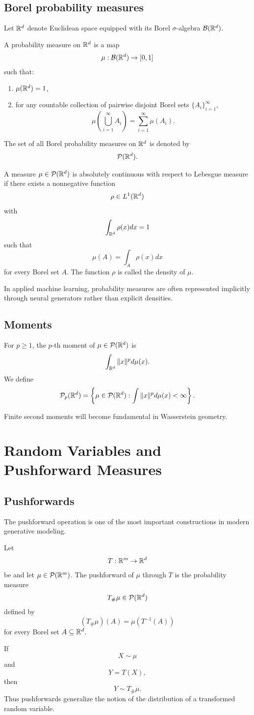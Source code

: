 \subsection{Borel probability measures}
Let $\mathbb{R}^d$ denote Euclidean space equipped with its Borel $\sigma$-algebra $\mathcal{B}(\mathbb{R}^d)$.
\begin{definition}
A probability measure on $\mathbb{R}^d$ is a map
\[
\mu : \mathcal{B}(\mathbb{R}^d) \to [0,1]
\]
such that:
\begin{enumerate}[label=(\alph*)]
    \item $\mu(\mathbb{R}^d)=1$,
    \item for any countable collection of pairwise disjoint Borel sets $\{A_i\}_{i=1}^{\infty}$,
    \[
    \mu\left(\bigcup_{i=1}^{\infty} A_i\right)
    =
    \sum_{i=1}^{\infty} \mu(A_i).
    \]
\end{enumerate}
\end{definition}
The set of all Borel probability measures on $\mathbb{R}^d$ is denoted by
\[
\mathcal{P}(\mathbb{R}^d).
\]
\begin{definition}
A measure $\mu \in \mathcal{P}(\mathbb{R}^d)$ is absolutely continuous with respect to Lebesgue measure if there exists a nonnegative function
\[
\rho \in L^1(\mathbb{R}^d)
\]
with
\[
\int_{\mathbb{R}^d} \rho(x)dx =1
\]
such that
\[
\mu(A)=\int_A \rho(x)dx
\]
for every Borel set $A$.
The function $\rho$ is called the density of $\mu$.
\end{definition}
In applied machine learning, probability measures are often represented implicitly through neural generators rather than explicit densities.
\subsection{Moments}
\begin{definition}
For $p\ge 1$, the $p$-th moment of $\mu \in \mathcal{P}(\mathbb{R}^d)$ is
\[
\int_{\mathbb{R}^d} \|x\|^p d\mu(x).
\]
We define
\[
\mathcal{P}_p(\mathbb{R}^d)
=
\left\{
\mu \in \mathcal{P}(\mathbb{R}^d)
:
\int \|x\|^p d\mu(x)<\infty
\right\}.
\]
\end{definition}
Finite second moments will become fundamental in Wasserstein geometry.
\section{Random Variables and Pushforward Measures}
\subsection{Pushforwards}
The pushforward operation is one of the most important constructions in modern generative modeling.
\begin{definition}
Let
\[
T : \mathbb{R}^m \to \mathbb{R}^d
\]
be  and let $\mu \in \mathcal{P}(\mathbb{R}^m)$. The pushforward of $\mu$ through $T$ is the probability measure
\[
T_{\#}\mu \in \mathcal{P}(\mathbb{R}^d)
\]
defined by
\[
(T_{\#}\mu)(A)=\mu(T^{-1}(A))
\]
for every Borel set $A \subseteq \mathbb{R}^d$.
\end{definition}
\begin{remark}
If
\[
X \sim \mu
\]
and
\[
Y=T(X),
\]
then
\[
Y \sim T_{\#}\mu.
\]
Thus pushforwards generalize the notion of the distribution of a transformed random variable.
\end{remark}
